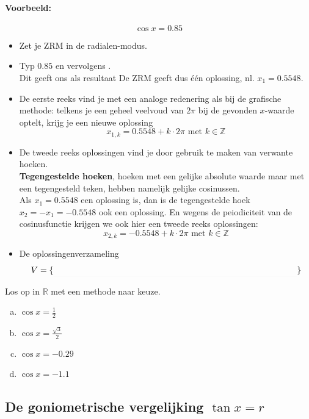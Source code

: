 \documentclass[a4paper,12pt,twoside]{article}
\begin{document}
\paragraph*{Voorbeeld:}
$$\cos x = 0.85$$
\begin{itemize}
  \item Zet je ZRM in de radialen-modus.
  \item Typ $0.85$ en vervolgens  .\\
  Dit geeft ons als resultaat \arulefill
  De ZRM geeft dus één oplossing, nl. $x_{1}=0.5548$.
  \item De eerste reeks vind je met een analoge redenering als bij de grafische methode: telkens je een geheel veelvoud van $2\pi$ bij de gevonden $x$-waarde optelt, krijg je een nieuwe oplossing
  $$x_{1,k}=0.5548+k\cdot2\pi \mbox{ met } k \in \mathbb{Z}$$
  \item De tweede reeks oplossingen vind je door gebruik te maken van verwante hoeken.\\
  \textbf{Tegengestelde hoeken}, hoeken met een gelijke absolute waarde maar met een tegengesteld teken, hebben namelijk gelijke cosinussen.\\
  Als $x_{1}=0.5548$ een oplossing is, dan is de tegengestelde hoek $x_2=-x_1=-0.5548$ ook een oplossing. En wegens de peiodiciteit van de cosinusfunctie krijgen we ook hier een tweede reeks oplossingen:\\
  $$x_{2,k}=-0.5548+k\cdot 2\pi \mbox{ met } k \in \mathbb{Z}$$
  \item De oplossingenverzameling
  $$V = \{\arule{10cm}\}$$
\end{itemize}

\begin{oefening}
Los op in $\mathbb{R}$ met een methode naar keuze.
\begin{enumerate}[(a)]
  \item $\cos x=\frac{1}{2}$
  \item $\cos x=\frac{\sqrt{3}}{2}$
  \item $\cos x=-0.29$
  \item $\cos x=-1.1$
\end{enumerate}
\end{oefening}

\subsection{De goniometrische vergelijking $\tan x=r$}
\end{document}
